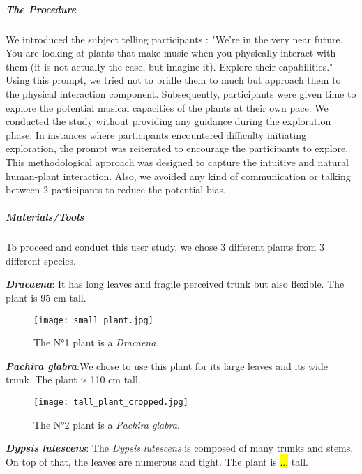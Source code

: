 \subparagraph{The Procedure} 
We introduced the subject telling participants : 
"We're in the very near future. You are looking at plants that make music when you physically interact with them (it is not actually the case, but imagine it). Explore their capabilities."
Using this prompt, we tried not to bridle them to much but approach them to the physical interaction component.
Subsequently, participants were given time to explore the potential musical capacities of the plants at their own pace.
We conducted the study without providing any guidance during the exploration phase.
In instances where participants encountered difficulty initiating exploration, the prompt was reiterated to encourage the participants to explore.
This methodological approach was designed to capture the intuitive and natural human-plant interaction.
Also, we avoided any kind of communication or talking between 2 participants to reduce the potential bias.


\subparagraph{Materials/Tools}

To proceed and conduct this user study, we chose 3 different plants from 3 different species.


\textit{\textbf{Dracaena}}: It has long leaves and fragile perceived trunk but also flexible. The plant is 95 cm tall.

\begin{figure}[h!]
    \centering
    \texttt{[image: small\_plant.jpg]}
    \caption{The N°1 plant is a \textit{Dracaena}.}
    
    \vspace{-0.5cm}
    \label{fig:small_plant}
    \vspace{0.2cm}
\end{figure}




\textit{\textbf{Pachira glabra}}:We chose to use this plant for its large leaves and its wide trunk.
The plant is 110 cm tall.

\begin{figure}[h!]
    \centering
    \texttt{[image: tall\_plant\_cropped.jpg]}
    \caption{The N°2 plant is a \textit{Pachira glabra}.}
    
    \vspace{-0.5cm}
    \label{fig:tall_plant}
    \vspace{0.2cm}
\end{figure}



\textit{\textbf{Dypsis lutescens}}: The \textit{Dypsis lutescens} is composed of many trunks and stems. On top of that, the leaves are numerous and tight. The plant is \hl{...} tall.

